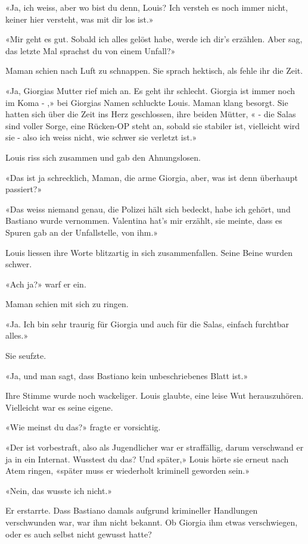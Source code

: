 «Ja, ich weiss, aber wo bist du denn, Louis? Ich versteh es noch immer
nicht, keiner hier versteht, was mit dir los ist.»

«Mir geht es gut. Sobald ich alles gelöst habe, werde ich dir’s
erzählen. Aber sag, das letzte Mal sprachst du von einem Unfall?»

Maman schien nach Luft zu schnappen. Sie sprach hektisch, als fehle ihr
die Zeit.

«Ja, Giorgias Mutter rief mich an. Es geht ihr schlecht. Giorgia ist
immer noch im Koma - ,» bei Giorgias Namen schluckte Louis. Maman klang besorgt. Sie hatten sich
über die Zeit ins Herz geschlossen, ihre beiden Mütter, « - die Salas sind voller Sorge, eine Rücken-OP steht an, sobald sie stabiler ist, vielleicht wird sie - also ich weiss nicht, wie schwer sie verletzt ist.»

Louis riss sich zusammen und gab den Ahnungslosen.

«Das ist ja schrecklich, Maman, die arme Giorgia, aber, was ist denn
überhaupt passiert?»

«Das weiss niemand genau, die Polizei hält sich bedeckt, habe ich
gehört, und Bastiano wurde vernommen. Valentina hat’s mir erzählt, sie
meinte, dass es Spuren gab an der Unfallstelle, von ihm.»

Louis liessen ihre Worte blitzartig in sich zusammenfallen. Seine Beine
wurden schwer.

«Ach ja?» warf er ein.

Maman schien mit sich zu ringen.

«Ja. Ich bin sehr traurig für Giorgia und auch für die Salas, einfach
furchtbar alles.»

Sie seufzte.

«Ja, und man sagt, dass Bastiano kein unbeschriebenes Blatt ist.»

Ihre Stimme wurde noch wackeliger. Louis glaubte, eine leise Wut
herauszuhören. Vielleicht war es seine eigene.

«Wie meinst du das?» fragte er vorsichtig.

«Der ist vorbestraft, also als Jugendlicher war er straffällig, darum
verschwand er ja in ein Internat. Wusstest du das? Und später,» Louis
hörte sie erneut nach Atem ringen, «später muss er wiederholt kriminell
geworden sein.»

«Nein, das wusste ich nicht.»

Er erstarrte. Dass Bastiano damals aufgrund krimineller Handlungen
verschwunden war, war ihm nicht bekannt. Ob Giorgia ihm etwas
verschwiegen, oder es auch selbst nicht gewusst hatte?


